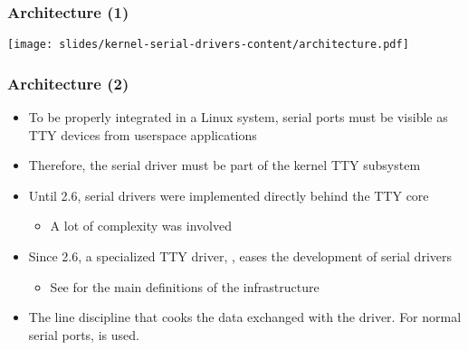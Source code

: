 \begin{frame}
  \frametitle{Architecture (1)}
  \begin{center}
    \texttt{[image: slides/kernel-serial-drivers-content/architecture.pdf]}
  \end{center}
\end{frame}

\begin{frame}
  \frametitle{Architecture (2)}
  \begin{itemize}
  \item To be properly integrated in a Linux system, serial ports must
    be visible as TTY devices from userspace applications
  \item Therefore, the serial driver must be part of the kernel TTY
    subsystem
  \item Until 2.6, serial drivers were implemented directly behind the
    TTY core
    \begin{itemize}
    \item A lot of complexity was involved
    \end{itemize}
  \item Since 2.6, a specialized TTY driver, , eases
    the development of serial drivers
    \begin{itemize}
    \item See  for the main
      definitions of the  infrastructure
    \end{itemize}
  \item The line discipline that cooks the data exchanged with the
     driver. For normal serial ports,  is used.
  \end{itemize}
\end{frame}

